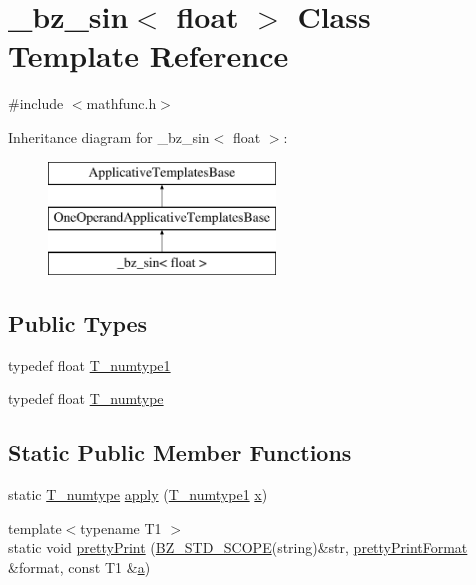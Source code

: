 \hypertarget{class__bz__sin_3_01float_01_4}{}\section{\+\_\+bz\+\_\+sin$<$ float $>$ Class Template Reference}
\label{class__bz__sin_3_01float_01_4}


{\ttfamily \#include $<$mathfunc.\+h$>$}

Inheritance diagram for \+\_\+bz\+\_\+sin$<$ float $>$\+:\begin{figure}[H]
\begin{center}
\leavevmode
\includegraphics[height=3.000000cm]{class__bz__sin_3_01float_01_4}
\end{center}
\end{figure}
\subsection*{Public Types}
\begin{DoxyCompactItemize}
\item 
typedef float \hyperlink{class__bz__sin_3_01float_01_4_ad56e85abc25760cfb7beae225b2b3460}{T\+\_\+numtype1}
\item 
typedef float \hyperlink{class__bz__sin_3_01float_01_4_a4b8f4b8d4559a3d4afe57965bf58bedc}{T\+\_\+numtype}
\end{DoxyCompactItemize}
\subsection*{Static Public Member Functions}
\begin{DoxyCompactItemize}
\item 
static \hyperlink{class__bz__sin_3_01float_01_4_a4b8f4b8d4559a3d4afe57965bf58bedc}{T\+\_\+numtype} \hyperlink{class__bz__sin_3_01float_01_4_ace702b91e13d2cf68231ab84eb01a653}{apply} (\hyperlink{class__bz__sin_3_01float_01_4_ad56e85abc25760cfb7beae225b2b3460}{T\+\_\+numtype1} \hyperlink{vecnorm1_8cc_ac73eed9e41ec09d58f112f06c2d6cb63}{x})
\item 
{\footnotesize template$<$typename T1 $>$ }\\static void \hyperlink{class__bz__sin_3_01float_01_4_ac8c3235df95161c39a5fb5b885ce4fe6}{pretty\+Print} (\hyperlink{numinquire_8h_a2b24ffc3b4ef9803956bc7715c6c7b83}{B\+Z\+\_\+\+S\+T\+D\+\_\+\+S\+C\+O\+P\+E}(string)\&str, \hyperlink{classprettyPrintFormat}{pretty\+Print\+Format} \&format, const T1 \&\hyperlink{gen__mat5files_8m_aae328bf20413f220e38aec4d95bfd6da}{a})
\end{DoxyCompactItemize}


